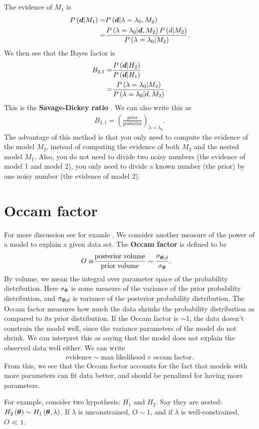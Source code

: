 The evidence of $M_1$ is
\begin{align}
    P\left({\bm d}|M_1\right)
    =&
    P\left({\bm d}|\lambda=\lambda_0,M_2\right)
    \nonumber\\
    =&
    \frac{
        P\left(\lambda=\lambda_0|{\bm d},M_2\right)P\left(d|M_2\right)
    }{
        P\left(\lambda=\lambda_0|M_2\right)
    } 
    .
\end{align}
We then see that the Bayes factor is
\begin{align}
    B_{2,1}
    =&
    \frac{P\left({\bm d}|H_2\right)}{P\left({\bm d}|H_1\right)}
    \nonumber\\
    =&
    \frac{
        P\left(\lambda=\lambda_0|M_2\right)
    }{
        P\left(\lambda=\lambda_0|d,M_2\right)
    }
    .
\end{align}
This is the \textbf{Savage-Dickey ratio} \cite{dickey-lientz-savage-dicke-ratio}.
We can also write this as
\begin{align}
    B_{2,1}
    =
    \left(\frac{\mathrm{prior}}{\mathrm{posterior}}\right)_{\lambda=\lambda_0}
    .
\end{align}
The advantage of this method is that you only need to compute the
evidence of the model $M_2$, instead of computing the evidence of both 
$M_2$ and the nested model $M_1$.
Also, you do not need to divide two noisy numbers (the evidence of
model 1 and model 2), you only need to divide a known number
(the prior) by one noisy number (the evidence of model 2).


\section{Occam factor}

For more discussion see for examle \cite{Mackay-information-theory-book}.
We consider another measure of the power of a model to explain a given data set.
The \textbf{Occam factor} is defined to be
\begin{align}
    O
    \equiv&
    \frac{\mathrm{posterior\; volume}}{\mathrm{prior\; volume}}
    \sim 
    \frac{\sigma_{{\bm \theta}|d}}{\sigma_{{\bm \theta}}}
    .
\end{align}
By volume, we mean the integral over parameter space of the
probability distribution.
Here $\sigma_{{\bm \theta}}$ is some measure of the variance of the
prior probability distribution, and $\sigma_{{\bm \theta}|d}$ is variance
of the posterior probability distribution.
The Occam factor measures how much the data shrinks the probability
distribution as compared to its prior distribution.
If the Occam factor is $\sim 1$, the data doesn't constrain
the model well, since the variance parameters of the model do not shrink.
We can interpret this as saying that the model does not explain the 
observed data well either.
We can write
\begin{align}
    \mathrm{evidence}
    \sim
    \mathrm{max\;likelihood}
    \times
    \mathrm{occam\; factor}
    .
\end{align}
From this, we see that 
the Occam factor accounts for the fact that models with more parameters
can fit data better, and should be penalized for having more parameters.

For example, consider two hypothesis: $H_1$ and $H_2$.
Say they are nested: $H_2\left({\bm \theta}\right) \sim H_1\left({\bm \theta},\lambda\right)$.
If $\lambda$ is unconstrained, $O\sim 1$, and if $\lambda$ is well-constrained,
$O\ll1$.


